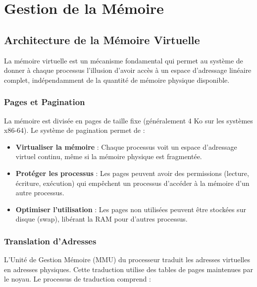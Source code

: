 \documentclass[12pt,a4paper]{article}
\begin{document}

\section{Gestion de la Mémoire}

\subsection{Architecture de la Mémoire Virtuelle}

La mémoire virtuelle est un mécanisme fondamental qui permet au système de donner à chaque processus l'illusion d'avoir accès à un espace d'adressage linéaire complet, indépendamment de la quantité de mémoire physique disponible.

\subsubsection{Pages et Pagination}

La mémoire est divisée en pages de taille fixe (généralement 4 Ko sur les systèmes x86-64). Le système de pagination permet de :

\begin{itemize}
    \item \textbf{Virtualiser la mémoire} : Chaque processus voit un espace d'adressage virtuel continu, même si la mémoire physique est fragmentée.
    
    \item \textbf{Protéger les processus} : Les pages peuvent avoir des permissions (lecture, écriture, exécution) qui empêchent un processus d'accéder à la mémoire d'un autre processus.
    
    \item \textbf{Optimiser l'utilisation} : Les pages non utilisées peuvent être stockées sur disque (swap), libérant la RAM pour d'autres processus.
\end{itemize}

\subsubsection{Translation d'Adresses}

L'Unité de Gestion Mémoire (MMU) du processeur traduit les adresses virtuelles en adresses physiques. Cette traduction utilise des tables de pages maintenues par le noyau. Le processus de traduction comprend :
\end{document}
